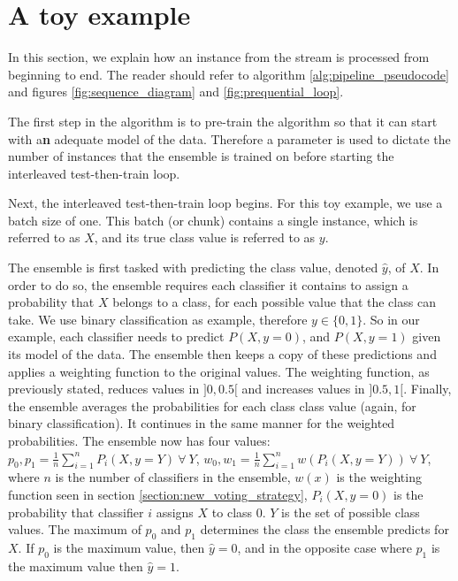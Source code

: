 
\section{A toy example}

In this section, we explain how an instance from the stream is processed from beginning to end. The reader should refer to algorithm \ref{alg:pipeline_pseudocode} and figures \ref{fig:sequence_diagram} and \ref{fig:prequential_loop}.

The first step in the algorithm is to pre-train the algorithm so that it can start with a\textbf{n} adequate model of the data. Therefore a parameter is used to dictate the number of instances that the ensemble is trained on before starting the interleaved test-then-train loop.

Next, the interleaved test-then-train loop begins. For this toy example, we use a batch size of one. This batch (or chunk) contains a single instance, which is referred to as $X$, and its true class value is referred to as $y$.

The ensemble is first tasked with predicting the class value, denoted $\hat{y}$, of $X$. In order to do so, the ensemble requires each classifier it contains to assign a probability that $X$ belongs to a class, for each possible value that the class can take. We use binary classification as example, therefore \textbf{$y \in \{0,1\}$}. So in our example, each classifier needs to predict $P(X, y=0)$, and $P(X, y=1)$ given its model of the data. The ensemble then keeps a copy of these predictions and applies a weighting function to the original values. The weighting function, as previously stated, reduces values in $]0,0.5[$ and increases values in $]0.5, 1[$. Finally, the ensemble averages the probabilities for each class class value (again, for binary classification). It continues in the same manner for the weighted probabilities. The ensemble now has four values: $p_0, p_1 = \frac{1}{n}\sum_{i=1}^{n} P_i(X, y=Y)\ \forall\ Y$,  $w_0,w_1=\frac{1}{n}\sum_{i=1}^{n} w(P_i(X, y=Y))\ \forall\ Y$, where $n$ is the number of classifiers in the ensemble, $w(x)$ is the weighting function seen in section \ref{section:new_voting_strategy}, $P_i(X, y=0)$ is the probability that classifier $i$ assigns $X$ to class $0$. $Y$ is the set of possible class values.
The maximum of $p_0$ and $p_1$ determines the class the ensemble predicts for $X$. If $p_0$ is the maximum value, then $\hat{y}=0$, and in the opposite case where $p_1$ is the maximum value then $\hat{y}=1$.

